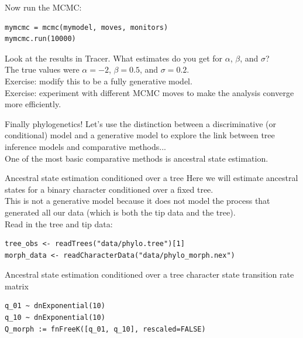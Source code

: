 \documentclass[mathserif]{beamer}
\begin{document}
\begin{frame}[fragile]
Now run the MCMC:
    \bigskip
    \begin{lstlisting}
mymcmc = mcmc(mymodel, moves, monitors)
mymcmc.run(10000)
    \end{lstlisting}
\bigskip
Look at the results in Tracer. What estimates do you get for $\alpha$, $\beta$, and $\sigma$?\\
    \bigskip
The true values were $\alpha = -2$, $\beta = 0.5$, and $\sigma = 0.2$.\\
    \bigskip
    \bigskip
    \alert{Exercise:} modify this to be a fully \alert{generative} model.\\
    \bigskip
    \alert{Exercise:} experiment with different MCMC moves to make the analysis converge more efficiently.
\end{frame}


\begin{frame}
    \begin{block}{Finally phylogenetics!}
        \bigskip
        Let's use the distinction between a \alert{discriminative} (or conditional) model and
        a \alert{generative} model to explore the link between tree inference models
        and comparative methods...\\
        \bigskip
        One of the most basic comparative methods is ancestral state estimation.
    \end{block}
\end{frame}


\begin{frame}[fragile]
    \begin{block}{Ancestral state estimation conditioned over a tree}
    \bigskip
    Here we will estimate ancestral states for a binary character conditioned over a fixed tree.\\
    \bigskip
        This is not a \alert{generative} model because it does not model the process that
        generated all our data (which is both the tip data and the tree).\\
    \bigskip
    Read in the tree and tip data:\\
    \bigskip
    \begin{lstlisting}
tree_obs <- readTrees("data/phylo.tree")[1]
morph_data <- readCharacterData("data/phylo_morph.nex")
    \end{lstlisting}
    \end{block}
\end{frame}

\begin{frame}[fragile]
    \begin{block}{Ancestral state estimation conditioned over a tree}
    \bigskip
 character state transition rate matrix
    \bigskip
    \begin{lstlisting}
q_01 ~ dnExponential(10)
q_10 ~ dnExponential(10)
Q_morph := fnFreeK([q_01, q_10], rescaled=FALSE)
    \end{lstlisting}
    \end{block}
\end{frame}
\end{document}
